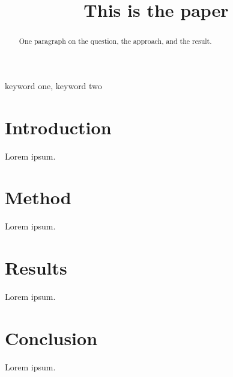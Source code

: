 \documentclass[conference]{IEEEtran}
\title{This is the paper}
\author{
  \IEEEauthorblockN{The Author}
  \IEEEauthorblockA{\textit{Department} \\
  \textit{Institution} \\
  City, Country \\
  author@example.org}
}
\begin{document}
\maketitle

\begin{abstract}
One paragraph on the question, the approach, and the result.
\end{abstract}

\begin{IEEEkeywords}
keyword one, keyword two
\end{IEEEkeywords}


\section{Introduction}

Lorem ipsum.

\section{Method}

Lorem ipsum.

\section{Results}


Lorem ipsum.

\section{Conclusion}

Lorem ipsum.


% 
% 
\end{document}

